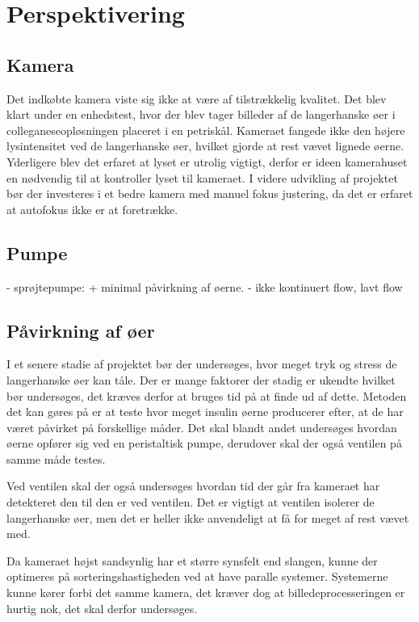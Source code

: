 \chapter{Perspektivering}
\section{Kamera}
Det indkøbte kamera viste sig ikke at være af tilstrækkelig kvalitet. Det blev klart under en enhedstest, hvor der blev tager billeder af de langerhanske øer i colleganeseopløsningen placeret i en petriskål. Kameraet fangede ikke den højere lysintensitet ved de langerhanske øer, hvilket gjorde at rest vævet lignede øerne. Yderligere blev det erfaret at lyset er utrolig vigtigt, derfor er ideen kamerahuset en nødvendig til at kontroller lyset til kameraet. I videre udvikling af projektet bør der investeres i et  bedre kamera med manuel fokus justering, da det er erfaret at autofokus ikke er at foretrække. 

\section{Pumpe}
- sprøjtepumpe: + minimal påvirkning af øerne. - ikke kontinuert flow, lavt flow
\section{Påvirkning af øer}
I et senere stadie af projektet bør der undersøges, hvor meget tryk og stress de langerhanske øer kan tåle. Der er mange faktorer der stadig er ukendte hvilket bør undersøges, det kræves derfor at bruges tid på at finde ud af dette. Metoden det kan gøres på er at teste hvor meget insulin øerne producerer efter, at de har været påvirket på forskellige måder. Det skal blandt andet undersøges hvordan øerne opfører sig ved en peristaltisk pumpe, derudover skal der også ventilen på samme måde testes. 

Ved ventilen skal der også undersøges hvordan tid der går fra kameraet har detekteret den til den er ved ventilen. Det er vigtigt at ventilen isolerer de langerhanske øer, men det er heller ikke anvendeligt at få for meget af rest vævet med.

Da kameraet højst sandsynlig har et større synsfelt end slangen, kunne der optimeres på sorteringshastigheden ved at have paralle systemer. Systemerne kunne kører forbi det samme kamera, det kræver dog at billedeprocesseringen er hurtig nok, det skal derfor undersøges.

